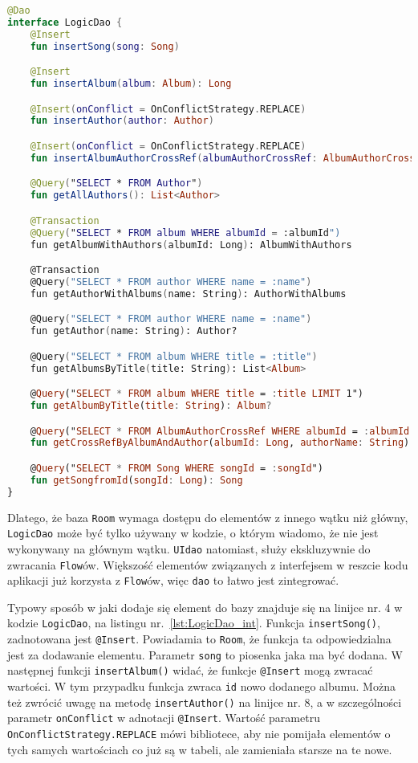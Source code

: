 \begin{lstlisting}[caption=Deklaracja interfejsu \texttt{LogicDao}, label={lst:LogicDao_int}, language=kotlin]
@Dao
interface LogicDao {
    @Insert
    fun insertSong(song: Song)

    @Insert
    fun insertAlbum(album: Album): Long

    @Insert(onConflict = OnConflictStrategy.REPLACE)
    fun insertAuthor(author: Author)

    @Insert(onConflict = OnConflictStrategy.REPLACE)
    fun insertAlbumAuthorCrossRef(albumAuthorCrossRef: AlbumAuthorCrossRef)

    @Query("SELECT * FROM Author")
    fun getAllAuthors(): List<Author>

    @Transaction
    @Query("SELECT * FROM album WHERE albumId = :albumId")
    fun getAlbumWithAuthors(albumId: Long): AlbumWithAuthors

    @Transaction
    @Query("SELECT * FROM author WHERE name = :name")
    fun getAuthorWithAlbums(name: String): AuthorWithAlbums

    @Query("SELECT * FROM author WHERE name = :name")
    fun getAuthor(name: String): Author?

    @Query("SELECT * FROM album WHERE title = :title")
    fun getAlbumsByTitle(title: String): List<Album>

    @Query("SELECT * FROM album WHERE title = :title LIMIT 1")
    fun getAlbumByTitle(title: String): Album?

    @Query("SELECT * FROM AlbumAuthorCrossRef WHERE albumId = :albumId AND name = :authorName LIMIT 1")
    fun getCrossRefByAlbumAndAuthor(albumId: Long, authorName: String): AlbumAuthorCrossRef?

    @Query("SELECT * FROM Song WHERE songId = :songId")
    fun getSongfromId(songId: Long): Song
}
\end{lstlisting}

Dlatego, że baza \texttt{Room} wymaga dostępu do elementów z innego wątku niż główny, \texttt{LogicDao} może być tylko używany w kodzie, o którym wiadomo, że nie jest wykonywany na głównym wątku. \texttt{UIdao} natomiast, służy ekskluzywnie do zwracania \texttt{Flow}ów. Większość elementów związanych z interfejsem w reszcie kodu aplikacji już korzysta z \texttt{Flow}ów, więc \texttt{dao} to łatwo jest zintegrować. 

Typowy sposób w jaki dodaje się element do bazy znajduje się na linijce nr. 4 w kodzie \texttt{LogicDao}, na listingu nr.~\ref{lst:LogicDao_int}. Funkcja \texttt{insertSong()}, zadnotowana jest \texttt{@Insert}. Powiadamia to \texttt{Room}, że funkcja ta odpowiedzialna jest za dodawanie elementu. Parametr \texttt{song} to piosenka jaka ma być dodana. W następnej funkcji \texttt{insertAlbum()} widać, że funkcje \texttt{@Insert} mogą zwracać wartości. W tym przypadku funkcja zwraca \texttt{id} nowo dodanego albumu. Można też zwrócić uwagę na metodę \texttt{insertAuthor()} na linijce nr. 8, a w szczególności parametr \texttt{onConflict} w adnotacji \texttt{@Insert}. Wartość parametru \texttt{OnConflictStrategy.REPLACE} mówi bibliotece, aby nie pomijała elementów o tych samych wartościach co już są w tabeli, ale zamieniała starsze na te nowe. 

